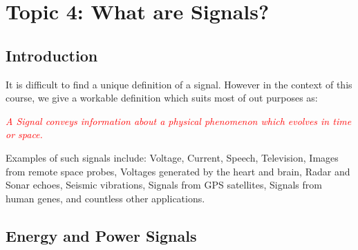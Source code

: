\documentclass[
  12pt,
  a4paper,
]{report}
\begin{document}
\newpage{}

\section{Topic 4: What are Signals?}\label{topic-4-what-are-signals}

\subsection{Introduction}\label{introduction}

It is difficult to find a unique definition of a signal. However in the context of this course, we give a workable definition which suits most of out purposes as:\\
\begin{mdframed}
    \begin{center}
        \textcolor{red}{\emph{A Signal conveys information about a physical phenomenon which evolves in time or space.}}
    \end{center}
\end{mdframed}

Examples of such signals include: Voltage, Current, Speech, Television,
Images from remote space probes, Voltages generated by the heart and
brain, Radar and Sonar echoes, Seismic vibrations, Signals from GPS
satellites, Signals from human genes, and countless other applications.

\subsection{Energy and Power Signals}\label{energy-and-power-signals}
\end{document}
